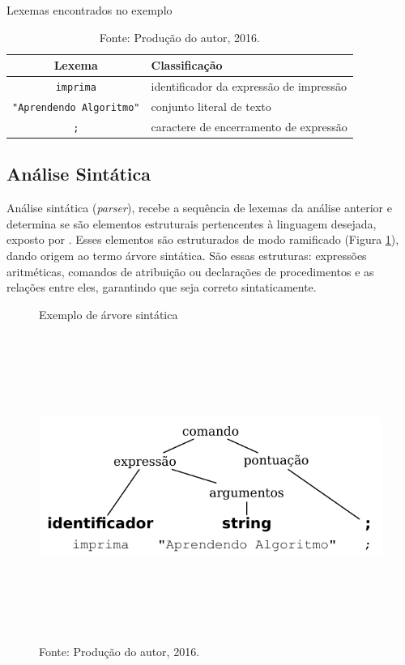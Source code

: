 \begin{table}[h]
\centering
  \caption{Lexemas encontrados no exemplo}\label{tab:lexemas}
\begin{tabular}{ c | l }\hline
\textbf{Lexema} & \textbf{Classificação} \\ \hline
\texttt{imprima} & identificador da expressão de impressão \\ \hline
\texttt{"Aprendendo Algoritmo"} & conjunto literal de texto \\ \hline
\texttt{;} & caractere de encerramento de expressão \\ \hline
\end{tabular}
  \caption*{\footnotesize Fonte: Produção do autor, 2016.}
\end{table}

\subsection{Análise Sintática}

Análise sintática (\textit{parser}), recebe a sequência de lexemas da análise anterior e determina se são elementos estruturais pertencentes à linguagem desejada, exposto por . Esses elementos são estruturados de modo ramificado (Figura \ref{fig:ast}), dando origem ao termo árvore sintática. São essas estruturas: expressões aritméticas, comandos de atribuição ou declarações de procedimentos e as relações entre eles, garantindo que seja correto sintaticamente.

\begin{figure}[h]
  \caption{Exemplo de árvore sintática}\label{fig:ast}
  \centering
\includegraphics[width=.65\textwidth,height=10cm,keepaspectratio]{figures/ast.pdf}
  \caption*{\footnotesize Fonte: Produção do autor, 2016.}
\end{figure}

